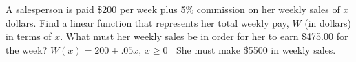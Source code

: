 {A salesperson is paid \$200 per week plus 5\% commission on her weekly sales of $x$ dollars.  Find a linear function that represents her total weekly pay, $W$ (in dollars) in terms of $x$.  What must her weekly sales be in order for her to earn \$475.00 for the week?}
{$W(x) = 200 + .05x,\, x \geq 0\;\;$ She must make \$5500 in weekly sales.
}